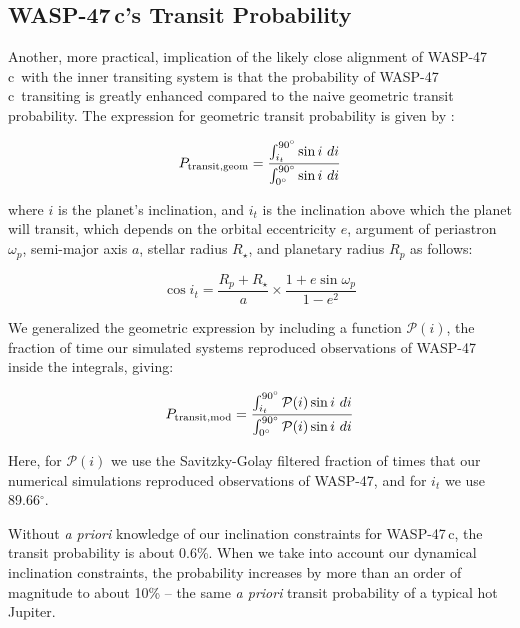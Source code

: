 \documentclass{emulateapj}
\newcommand{\thisstar}{WASP-47}
\newcommand{\thisfourthplanet}{WASP-47\,c}
\begin{document}
\subsection{ \thisfourthplanet's Transit Probability}

Another, more practical, implication of the likely close alignment of \thisfourthplanet\ with the inner transiting system is that the probability of \thisfourthplanet\ transiting is greatly enhanced compared to the naive geometric transit probability. The expression for geometric transit probability is given by \citet{sackett}: 

\begin{equation}
P_{\rm transit, geom} = \frac{\int_{i_{t}}^{90^\circ} \sin{i}\ di}{\int_{0^\circ}^{90^\circ} \sin{i}\ di} 
\label{normal_transit2}
\end{equation}

\noindent where $i$ is the planet's inclination, and $i_t$ is the inclination above which the planet will transit, which depends on the orbital eccentricity $e$, argument of periastron $\omega_p$, semi-major axis $a$, stellar radius $R_\star$, and planetary radius $R_p$ as follows:

\begin{equation}
\cos{i_t} = \frac{R_p + R_\star}{a} \times \frac{1 + e \sin{\omega_p}}{1-e^2}
\label{critical_inclination2}
\end{equation}

We generalized the geometric expression by including a function $\mathcal{P}(i)$, the fraction of time our simulated systems reproduced observations of \thisstar\, inside the integrals, giving: 

\begin{equation}
P_{\rm transit, mod} = \frac{\int_{i_{t}}^{90^\circ} \mathcal{P}(i) \sin{i}\ di}{\int_{0^\circ}^{90^\circ} \mathcal{P}(i) \sin{i}\ di} 
\label{modified_transit2}
\end{equation}

Here, for $\mathcal{P}(i)$ we use the Savitzky-Golay filtered fraction of times that our numerical simulations reproduced observations of \thisstar, and for $i_{t}$ we use 89.66$^\circ$. %

Without {\em a priori} knowledge of our inclination constraints for \thisfourthplanet, the transit probability is about 0.6\%. When we take into account our dynamical inclination constraints, the probability increases by more than an order of magnitude to about 10\% -- the same {\em a priori} transit probability of a typical hot Jupiter. 
\end{document}
